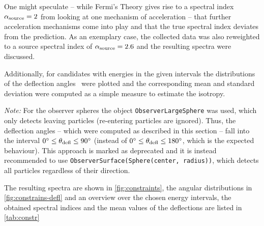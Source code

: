 One might speculate -- while Fermi's Theory gives rise to a spectral index
$\alpha_{\mathrm{source}}=2$ from looking at one mechanism of acceleration -- that further
acceleration mechanisms come into play and that the true spectral index
deviates from the prediction. As an exemplary case, the collected data was also
reweighted to a source spectral index of $\alpha_{\mathrm{source}}=2.6$ and the resulting
spectra were discussed.

Additionally, for candidates with energies in the given intervals the
distributions of the deflection angles \ablenkung~were plotted and the
corresponding mean and standard deviation were computed as a simple measure to
estimate the isotropy.

\emph{Note:} For the observer spheres the object \texttt{ObserverLargeSphere}
was used, which only detects leaving particles (re-entering particles are
ignored).
Thus, the deflection angles -- which were computed as described in this section
-- fall into the interval $\inrange{\ablenkung}{0}{90}{\degree}$ (instead of
$\inrange{\ablenkung}{0}{180}{\degree}$, which is the expected behaviour).
This approach is marked as deprecated and it is instead recommended
to use \texttt{ObserverSurface(Sphere(center, radius))}, which detects all
particles regardless of their direction.

The resulting spectra are shown in \cref{fig:constraints}, the angular
distributions in \cref{fig:constrains-defl} and an overview over the chosen
energy intervals, the obtained spectral indices and the mean values of the
deflections are listed in \cref{tab:constr}

